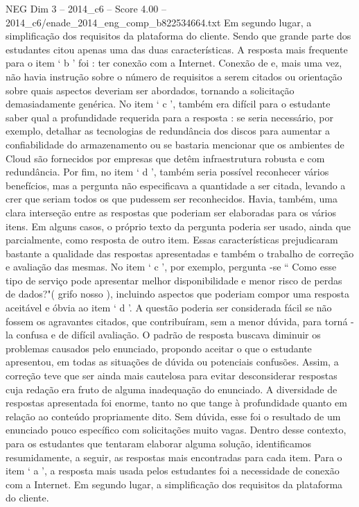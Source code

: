 \begin{textsample}{NEG Dim 3 – 2014\_c6 – Score 4.00 – 2014\_c6/enade\_2014\_eng\_comp\_b822534664.txt}
Em segundo lugar, a simplificação dos requisitos da plataforma do cliente.
Sendo que grande parte dos estudantes citou apenas uma das duas características.
A resposta mais frequente para o item ‘ b ’ foi : ter conexão com a Internet.
Conexão de e, mais uma vez, não havia instrução sobre o número de requisitos a serem citados ou orientação sobre quais aspectos deveriam ser abordados, tornando a solicitação demasiadamente genérica.
No item ‘ c ’, também era difícil para o estudante saber qual a profundidade requerida para a resposta : se seria necessário, por exemplo, detalhar as tecnologias de redundância dos discos para aumentar a confiabilidade do armazenamento ou se bastaria mencionar que os ambientes de Cloud são fornecidos por empresas que detêm infraestrutura robusta e com redundância.
Por fim, no item ‘ d ’, também seria possível reconhecer vários benefícios, mas a pergunta não especificava a quantidade a ser citada, levando a crer que seriam todos os que pudessem ser reconhecidos.
Havia, também, uma clara interseção entre as respostas que poderiam ser elaboradas para os vários itens.
Em alguns casos, o próprio texto da pergunta poderia ser usado, ainda que parcialmente, como resposta de outro item.
Essas características prejudicaram bastante a qualidade das respostas apresentadas e também o trabalho de correção e avaliação das mesmas.
No item ‘ c ’, por exemplo, pergunta -se “ Como esse tipo de serviço pode apresentar melhor disponibilidade e menor risco de perdas de dados?"( grifo nosso ), incluindo aspectos que poderiam compor uma resposta aceitável e óbvia ao item ‘ d ’.
A questão poderia ser considerada fácil se não fossem os agravantes citados, que contribuíram, sem a menor dúvida, para torná -la confusa e de difícil avaliação.
O padrão de resposta buscava diminuir os problemas causados pelo enunciado, propondo aceitar o que o estudante apresentou, em todas as situações de dúvida ou potenciais confusões.
Assim, a correção teve que ser ainda mais cautelosa para evitar desconsiderar respostas cuja redação era fruto de alguma inadequação do enunciado.
A diversidade de respostas apresentada foi enorme, tanto no que tange à profundidade quanto em relação ao conteúdo propriamente dito.
Sem dúvida, esse foi o resultado de um enunciado pouco específico com solicitações muito vagas.
Dentro desse contexto, para os estudantes que tentaram elaborar alguma solução, identificamos resumidamente, a seguir, as respostas mais encontradas para cada item.
Para o item ‘ a ’, a resposta mais usada pelos estudantes foi a necessidade de conexão com a Internet.
Em segundo lugar, a simplificação dos requisitos da plataforma do cliente.

\end{textsample}
